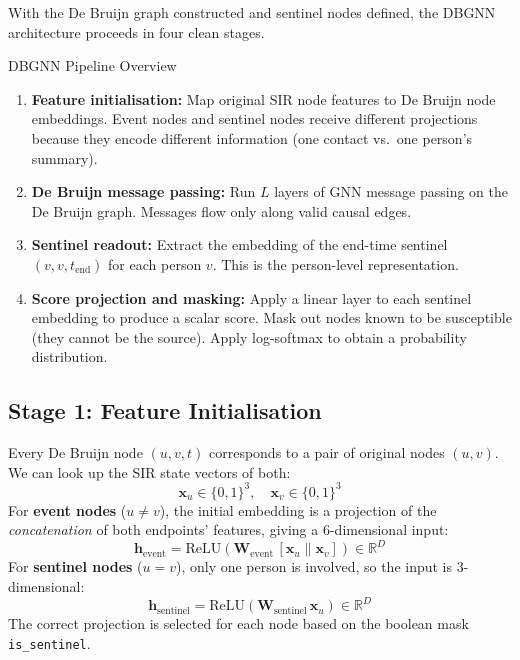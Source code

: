 With the De Bruijn graph constructed and sentinel nodes defined, the DBGNN architecture
proceeds in four clean stages.

\begin{conceptbox}{DBGNN Pipeline Overview}
\begin{enumerate}
    \item \textbf{Feature initialisation:} Map original SIR node features to De Bruijn node
          embeddings. Event nodes and sentinel nodes receive different projections because they
          encode different information (one contact vs.\ one person's summary).
    \item \textbf{De Bruijn message passing:} Run $L$ layers of GNN message passing on the De
          Bruijn graph. Messages flow only along valid causal edges.
    \item \textbf{Sentinel readout:} Extract the embedding of the end-time sentinel
          $(v, v, t_{\text{end}})$ for each person $v$. This is the person-level representation.
    \item \textbf{Score projection and masking:} Apply a linear layer to each sentinel embedding
          to produce a scalar score. Mask out nodes known to be susceptible (they cannot be
          the source). Apply log-softmax to obtain a probability distribution.
\end{enumerate}
\end{conceptbox}

\subsection{Stage 1: Feature Initialisation}

Every De Bruijn node $(u, v, t)$ corresponds to a pair of original nodes $(u, v)$. We can look
up the SIR state vectors of both:
\[
    \mathbf{x}_u \in \{0,1\}^3, \quad \mathbf{x}_v \in \{0,1\}^3
\]
For \textbf{event nodes} ($u \neq v$), the initial embedding is a projection of the
\emph{concatenation} of both endpoints' features, giving a 6-dimensional input:
\[
    \mathbf{h}_{\text{event}} = \text{ReLU}\!\left(\mathbf{W}_{\text{event}}\, [\mathbf{x}_u \| \mathbf{x}_v]\right)
    \in \mathbb{R}^D
\]
For \textbf{sentinel nodes} ($u = v$), only one person is involved, so the input is 3-dimensional:
\[
    \mathbf{h}_{\text{sentinel}} = \text{ReLU}\!\left(\mathbf{W}_{\text{sentinel}}\, \mathbf{x}_u\right)
    \in \mathbb{R}^D
\]
The correct projection is selected for each node based on the boolean mask \texttt{is\_sentinel}.

